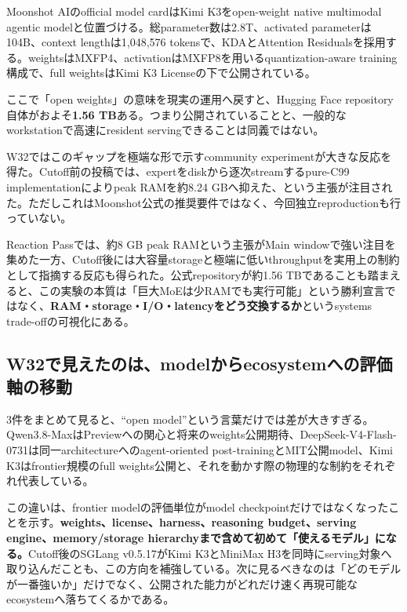 Moonshot AIのofficial model cardはKimi K3をopen-weight native multimodal agentic modelと位置づける。総parameter数は2.8T、activated parameterは104B、context lengthは1,048,576 tokensで、KDAとAttention Residualsを採用する。weightsはMXFP4、activationはMXFP8を用いるquantization-aware training構成で、full weightsはKimi K3 Licenseの下で公開されている\cite{kimi-k3-hf}。

ここで「open weights」の意味を現実の運用へ戻すと、Hugging Face repository自体がおよそ\textbf{1.56 TB}ある\cite{kimi-k3-files}。つまり公開されていることと、一般的なworkstationで高速にresident servingできることは同義ではない。

W32ではこのギャップを極端な形で示すcommunity experimentが大きな反応を得た。Cutoff前の投稿では、expertをdiskから逐次streamするpure-C99 implementationによりpeak RAMを約8.24 GBへ抑えた、という主張が注目された\cite{kimi-k3-x-lowram}。ただしこれはMoonshot公式の推奨要件ではなく、今回独立reproductionも行っていない。

\begin{communitynote}[「動く」と「使える」の間]
Reaction Passでは、約8 GB peak RAMという主張がMain windowで強い注目を集めた一方、Cutoff後には大容量storageと極端に低いthroughputを実用上の制約として指摘する反応も得られた\cite{kimi-k3-x-practicality}。公式repositoryが約1.56 TBであることも踏まえると、この実験の本質は「巨大MoEは少RAMでも実行可能」という勝利宣言ではなく、\textbf{RAM・storage・I/O・latencyをどう交換するか}というsystems trade-offの可視化にある。
\end{communitynote}

\subsection*{W32で見えたのは、modelからecosystemへの評価軸の移動}

3件をまとめて見ると、``open model''という言葉だけでは差が大きすぎる。Qwen3.8-MaxはPreviewへの関心と将来のweights公開期待、DeepSeek-V4-Flash-0731は同一architectureへのagent-oriented post-trainingとMIT公開model、Kimi K3はfrontier規模のfull weights公開と、それを動かす際の物理的な制約をそれぞれ代表している\cite{qwen38-token-plan,deepseek-v4-flash-0731,deepseek-v4-flash-hf,kimi-k3-hf}。

この違いは、frontier modelの評価単位がmodel checkpointだけではなくなったことを示す。\textbf{weights、license、harness、reasoning budget、serving engine、memory/storage hierarchyまで含めて初めて「使えるモデル」になる。}Cutoff後のSGLang v0.5.17がKimi K3とMiniMax H3を同時にserving対象へ取り込んだことも、この方向を補強している\cite{sglang-0517}。次に見るべきなのは「どのモデルが一番強いか」だけでなく、公開された能力がどれだけ速く再現可能なecosystemへ落ちてくるかである。
